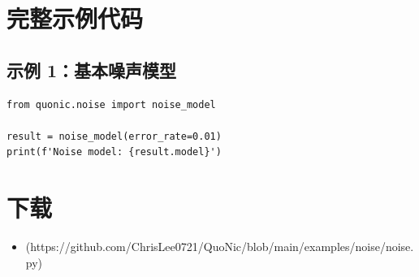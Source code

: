 \documentclass[12pt,a4paper]{article}
\begin{document}
\section{完整示例代码}

\subsection{示例 1：基本噪声模型}

\begin{verbatim}
from quonic.noise import noise_model

result = noise_model(error_rate=0.01)
print(f'Noise model: {result.model}')
\end{verbatim}

\section{下载}

\begin{itemize}
  \item [noise.py](https://github.com/ChrisLee0721/QuoNic/blob/main/examples/noise/noise.py)
\end{itemize}
\end{document}
